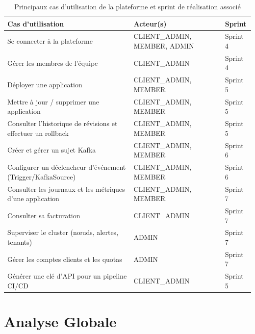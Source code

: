     \begin{table}[!ht]
    \begin{center}
         \begin{tabular}{|l{6cm}|l{4cm}|l{2cm}|}
         \hline
         \textbf{Cas d'utilisation} & \textbf{Acteur(s)} & \textbf{Sprint} \\
         \hline
         Se connecter à la plateforme & CLIENT\_ADMIN, MEMBER, ADMIN & Sprint 4 \\
         \hline
         Gérer les membres de l'équipe & CLIENT\_ADMIN & Sprint 4 \\
         \hline
         Déployer une application & CLIENT\_ADMIN, MEMBER & Sprint 5 \\
         \hline
         Mettre à jour / supprimer une application & CLIENT\_ADMIN, MEMBER & Sprint 5 \\
         \hline
         Consulter l'historique de révisions et effectuer un rollback & CLIENT\_ADMIN, MEMBER & Sprint 5 \\
         \hline
         Créer et gérer un sujet Kafka & CLIENT\_ADMIN, MEMBER & Sprint 6 \\
         \hline
         Configurer un déclencheur d'événement (Trigger/KafkaSource) & CLIENT\_ADMIN, MEMBER & Sprint 6 \\
         \hline
         Consulter les journaux et les métriques d'une application & CLIENT\_ADMIN, MEMBER & Sprint 7 \\
         \hline
         Consulter sa facturation & CLIENT\_ADMIN & Sprint 7 \\
         \hline
         Superviser le cluster (nœuds, alertes, tenants) & ADMIN & Sprint 7 \\
         \hline
         Gérer les comptes clients et les quotas & ADMIN & Sprint 7 \\
         \hline
         Générer une clé d'API pour un pipeline CI/CD & CLIENT\_ADMIN & Sprint 5 \\
         \hline
         \end{tabular}
         \caption{Principaux cas d'utilisation de la plateforme et sprint de réalisation associé}
         \label{tab:uc-global}
         \end{center}
         \end{table}
    
    
    \section{Analyse Globale}
    
